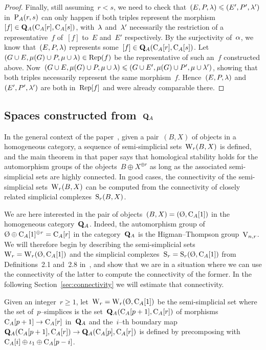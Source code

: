\begin{proof}
Finally, still assuming~$r<s$, we need to check that~$(E,P,\lambda)\leqslant (E',P',\lambda')$ in~$\mathrm{P}_A(r,s)$ can only happen if both triples represent the morphism~$[f]\in \mathbf{Q}_A(\mathrm{C}_A[r],\mathrm{C}_A[s])$, with~$\lambda$ and~$\lambda'$ necessarily the restriction of a representative~$f$ of~$[f]$ to~$E$ and~$E'$ respectively. By the surjectivity of~$\alpha$, we know that~$(E,P,\lambda)$ represents some~$[f]\in \mathbf{Q}_A(\mathrm{C}_A[r],\mathrm{C}_A[s])$. Let~$(G\cup E,\mu(G)\cup P,\mu\cup \lambda)\in \operatorname{Rep}(f)$ be the representative of such an~$f$ constructed above. Now~$(G\cup E,\mu(G)\cup P,\mu\cup \lambda)\leqslant (G\cup E',\mu(G)\cup P',\mu\cup \lambda')$, showing that both triples necessarily represent the same morphism~$f$.  Hence~$(E,P,\lambda)$ and~$(E',P',\lambda')$ are both in~$\operatorname{Rep}[f]$ and were already comparable there. 
\end{proof}


\subsection{Spaces constructed from~$\mathbf{Q}_A$}

In the general context of the paper~\cite{Randal-Williams+Wahl}, given a pair~$(B,X)$ of objects in a homogeneous category, a sequence of semi-simplicial sets~$\mathrm{W}_r(B,X)$ is defined, and the main theorem in that paper says that homological stability holds for the automorphism groups of the objects~\hbox{$B\oplus X^{\oplus r}$} 
as long as the associated semi-simplicial sets are highly connected. In good cases, the connectivity of the semi-simplicial sets~$\mathrm{W}_r(B,X)$ can be computed from the connectivity of closely related simplicial complexes~$\mathrm{S}_r(B,X)$. 

We are here interested in the pair of objects~$(B,X)=(\emptyset,\rmC_A[1])$ in the homogeneous category~$\mathbf{Q}_A$. Indeed, the automorphism group of~$\emptyset\oplus\rmC_A[1]^{\oplus r}=\rmC_A[r]$ in the category~$\mathbf{Q}_A$ is the Higman--Thompson group~$\mathrm{V}_{n,r}$. We will therefore begin by describing the semi-simplicial sets~\hbox{$\rmW_r=\rmW_r(\emptyset,\rmC_A[1])$} and the simplicial complexes~$\rmS_r=\rmS_r(\emptyset,\rmC_A[1])$ from Definitions~2.1 and~2.8 in~\cite{Randal-Williams+Wahl}, and show that we are in a situation where we can use the connectivity of the latter to compute the connectivity of the former. In the following Section~\ref{sec:connectivity} we will estimate that connectivity. 

\begin{definition}
Given an integer~$r\geqslant1$, let~$\rmW_r=\rmW_r(\emptyset,\rmC_A[1])$ be the semi-simplicial set where the set of~$p$--simplices is the set~$\mathbf{Q}_A(\mathrm{C}_A[p+1],\mathrm{C}_A[r])$ of morphisms $\mathrm{C}_A[p+1]\to\mathrm{C}_A[r]$ in~$\mathbf{Q}_A$ and the~$i$--th boundary map~\hbox{$\mathbf{Q}_A(\mathrm{C}_A[p+1],\mathrm{C}_A[r])\to \mathbf{Q}_A(\mathrm{C}_A[p],\mathrm{C}_A[r])$} is defined by precomposing 
with~\hbox{$\mathrm{C}_A[i]\oplus\iota_{1}\oplus\mathrm{C}_A[p-i]$}.
\end{definition}

